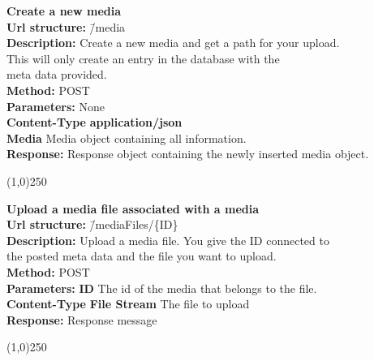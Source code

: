 \documentclass[11pt]{article}
\begin{document}
\begin{tabbing}
\textbf{Create a new media} \\
\textcolor{black!60}{\textbf{Url structure:}} \hspace{0.2in} \= /media \\
\textcolor{black!60}{\textbf{Description:}}  \> Create a new media and get a path for your upload. \\ \> This will only create an entry in the database with the \\ \> meta data provided. \\
\textcolor{black!60}{\textbf{Method:}} \> POST \\
\textcolor{black!60}{\textbf{Parameters:}} \> None \\
\textcolor{black!60}{\textbf{Content-Type}} \> \textbf{application/json} \\
\> \textbf{Media} Media object containing all information. \\
\textcolor{black!60}{\textbf{Response:}} \> Response object containing the newly inserted media object.
\end{tabbing}

\begin{center}\line(1,0){250}\end{center}

\begin{tabbing}
\textbf{Upload a media file associated with a media} \\
\textcolor{black!60}{\textbf{Url structure:}} \hspace{0.2in} \= /mediaFiles/\{ID\} \\
\textcolor{black!60}{\textbf{Description:}}  \> Upload a media file. You give the ID connected to \\ \> the posted meta data and the file you want to upload. \\
\textcolor{black!60}{\textbf{Method:}} \> POST \\
\textcolor{black!60}{\textbf{Parameters:}} \> \textbf{ID} The id of the media that belongs to the file. \\
\textcolor{black!60}{\textbf{Content-Type}} \> \textbf{File Stream} The file to upload \\
\textcolor{black!60}{\textbf{Response:}} \> Response message
\end{tabbing}

\begin{center}\line(1,0){250}\end{center}
\end{document}
